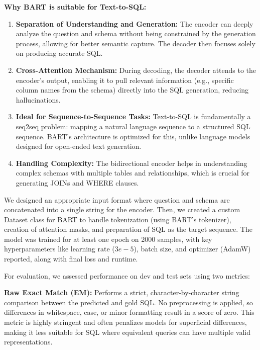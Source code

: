 \textbf{Why BART is suitable for Text-to-SQL:}
\begin{enumerate}
    \item \textbf{Separation of Understanding and Generation:} The encoder can deeply analyze the question and schema without being constrained by the generation process, allowing for better semantic capture. The decoder then focuses solely on producing accurate SQL.
    \item \textbf{Cross-Attention Mechanism:} During decoding, the decoder attends to the encoder's output, enabling it to pull relevant information (e.g., specific column names from the schema) directly into the SQL generation, reducing hallucinations.
    \item \textbf{Ideal for Sequence-to-Sequence Tasks:} Text-to-SQL is fundamentally a seq2seq problem: mapping a natural language sequence to a structured SQL sequence. BART's architecture is optimized for this, unlike language models designed for open-ended text generation.
    \item \textbf{Handling Complexity:} The bidirectional encoder helps in understanding complex schemas with multiple tables and relationships, which is crucial for generating JOINs and WHERE clauses.
\end{enumerate}

We designed an appropriate input format where question and schema are concatenated into a single string for the encoder. Then, we created a custom Dataset class for BART to handle tokenization (using BART's tokenizer), creation of attention masks, and preparation of SQL as the target sequence. The model was trained for at least one epoch on 2000 samples, with key hyperparameters like learning rate ($3e-5$), batch size, and optimizer (AdamW) reported, along with final loss and runtime.

For evaluation, we assessed performance on dev and test sets using two metrics:

\textbf{Raw Exact Match (EM):} Performs a strict, character-by-character string comparison between the predicted and gold SQL. No preprocessing is applied, so differences in whitespace, case, or minor formatting result in a score of zero. This metric is highly stringent and often penalizes models for superficial differences, making it less suitable for SQL where equivalent queries can have multiple valid representations.

